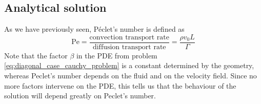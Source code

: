 
\subsection{Analytical solution}

As we have previously seen, Péclet's number is defined as
\begin{equation}
	\mathrm{Pe} = 
	\frac{\text{convection transport rate}}{\text{diffusion transport rate}} = 
	\frac{\rho v_0 L}{\Gamma}
\end{equation}
Note that the factor $\beta$ in the PDE from problem
\eqref{eq:diagonal_case_cauchy_problem} is a constant determined by the
geometry, whereas Peclet's number depends on the fluid and on the velocity
field. Since no more factors intervene on the PDE, this tells us that the
behaviour of the solution will depend greatly on Peclet's number. 



% 



